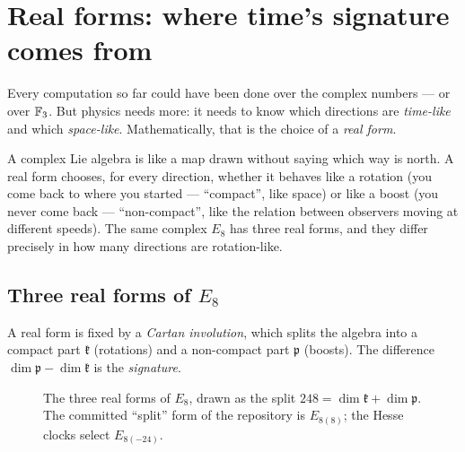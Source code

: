 \section{Real forms: where time's signature comes from}
\label{sec:real}

Every computation so far could have been done over the complex numbers --- or over
$\mathbb{F}_3$. But physics needs more: it needs to know which directions are \emph{time-like}
and which \emph{space-like}. Mathematically, that is the choice of a \emph{real form}.

\begin{plainwords}
A complex Lie algebra is like a map drawn without saying which way is north. A real form
chooses, for every direction, whether it behaves like a rotation (you come back to where
you started --- ``compact'', like space) or like a boost (you never come back ---
``non-compact'', like the relation between observers moving at different speeds). The
same complex $E_8$ has three real forms, and they differ precisely in how many directions
are rotation-like.
\end{plainwords}

\subsection{Three real forms of \texorpdfstring{$E_8$}{E8}}

A real form is fixed by a \emph{Cartan involution}, which splits the algebra into a
compact part $\mathfrak k$ (rotations) and a non-compact part $\mathfrak p$ (boosts). The
difference $\dim\mathfrak p-\dim\mathfrak k$ is the \emph{signature}.

\begin{figure}[htbp]
\centering
{}
\caption{The three real forms of $E_8$, drawn as the split $248=\dim\mathfrak k+\dim\mathfrak p$.
The committed ``split'' form of the repository is $E_{8(8)}$; the Hesse clocks select
$E_{8(-24)}$.}
\label{fig:realforms}
\end{figure}

